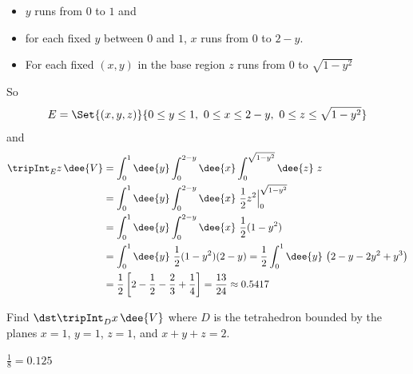 \begin{solution}
\begin{itemize}
\item 
   $y$ runs from $0$ to $1$ and
\item 
   for each fixed $y$ between $0$ and $1$, $x$ runs from $0$ to $2-y$.
\item
   For each fixed $(x,y)$ in the base region $z$ runs from $0$ 
   to $\sqrt{1-y^2}$
\end{itemize}
So
\begin{equation*}
E=\Set{(x,y,z)}{0\le y\le 1,\ 0\le x\le 2-y,\ 0\le z\le\sqrt{1-y^2} }
\end{equation*}
and
\begin{align*}
\tripInt_E z\,\dee{V}&=\int_0^1 \dee{y}\int_0^{2-y}\dee{x}\int_0^{\sqrt{1-y^2}}\dee{z}\ z\\
&=\int_0^1 \dee{y}\int_0^{2-y}\dee{x}\ \frac{1}{2} z^2\Big|_0^{\sqrt{1-y^2}} \\
&=\int_0^1 \dee{y}\int_0^{2-y}\dee{x}\ \frac{1}{2} (1-y^2) \\
&=\int_0^1 \dee{y}\ \frac{1}{2} (1-y^2)(2-y)
=\frac{1}{2}\int_0^1 \dee{y}\ \big(2-y-2y^2+y^3\big) \\
&=\frac{1}{2}\left[2-\frac{1}{2}-\frac{2}{3}+\frac{1}{4}\right]
=\frac{13}{24}\approx 0.5417
\end{align*}
\end{solution}

\begin{question} [M200 2001D] %
Find $\dst\tripInt_D x\,\dee{V}$ where $D$ is the tetrahedron bounded
by the planes $x=1$, $y=1$, $z=1$, and $x+y+z=2$.
\end{question}

%

\begin{answer}
$\frac{1}{8}=0.125$
\end{answer}

